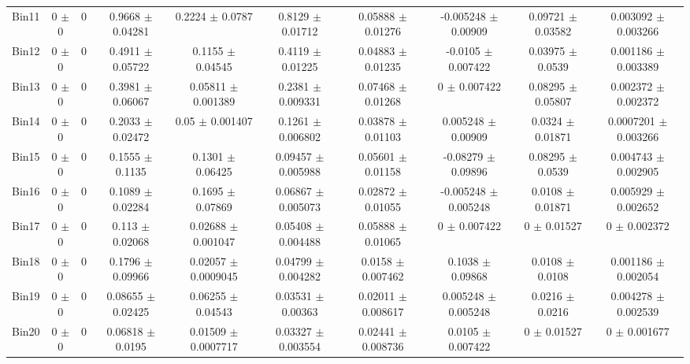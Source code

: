 \begin{tabular}{@{\extracolsep{4pt}}lccccccccc@{}}
     Bin11 & 0 $\pm$ 0 & 0 & 0.9668 $\pm$ 0.04281 & 0.2224 $\pm$ 0.0787 & 0.8129 $\pm$ 0.01712 & 0.05888 $\pm$ 0.01276 & -0.005248 $\pm$ 0.00909 & 0.09721 $\pm$ 0.03582 & 0.003092 $\pm$ 0.003266 \\ 
     Bin12 & 0 $\pm$ 0 & 0 & 0.4911 $\pm$ 0.05722 & 0.1155 $\pm$ 0.04545 & 0.4119 $\pm$ 0.01225 & 0.04883 $\pm$ 0.01235 & -0.0105 $\pm$ 0.007422 & 0.03975 $\pm$ 0.0539 & 0.001186 $\pm$ 0.003389 \\ 
     Bin13 & 0 $\pm$ 0 & 0 & 0.3981 $\pm$ 0.06067 & 0.05811 $\pm$ 0.001389 & 0.2381 $\pm$ 0.009331 & 0.07468 $\pm$ 0.01268 & 0 $\pm$ 0.007422 & 0.08295 $\pm$ 0.05807 & 0.002372 $\pm$ 0.002372 \\ 
     Bin14 & 0 $\pm$ 0 & 0 & 0.2033 $\pm$ 0.02472 & 0.05 $\pm$ 0.001407 & 0.1261 $\pm$ 0.006802 & 0.03878 $\pm$ 0.01103 & 0.005248 $\pm$ 0.00909 & 0.0324 $\pm$ 0.01871 & 0.0007201 $\pm$ 0.003266 \\ 
     Bin15 & 0 $\pm$ 0 & 0 & 0.1555 $\pm$ 0.1135 & 0.1301 $\pm$ 0.06425 & 0.09457 $\pm$ 0.005988 & 0.05601 $\pm$ 0.01158 & -0.08279 $\pm$ 0.09896 & 0.08295 $\pm$ 0.0539 & 0.004743 $\pm$ 0.002905 \\ 
     Bin16 & 0 $\pm$ 0 & 0 & 0.1089 $\pm$ 0.02284 & 0.1695 $\pm$ 0.07869 & 0.06867 $\pm$ 0.005073 & 0.02872 $\pm$ 0.01055 & -0.005248 $\pm$ 0.005248 & 0.0108 $\pm$ 0.01871 & 0.005929 $\pm$ 0.002652 \\ 
     Bin17 & 0 $\pm$ 0 & 0 & 0.113 $\pm$ 0.02068 & 0.02688 $\pm$ 0.001047 & 0.05408 $\pm$ 0.004488 & 0.05888 $\pm$ 0.01065 & 0 $\pm$ 0.007422 & 0 $\pm$ 0.01527 & 0 $\pm$ 0.002372 \\ 
     Bin18 & 0 $\pm$ 0 & 0 & 0.1796 $\pm$ 0.09966 & 0.02057 $\pm$ 0.0009045 & 0.04799 $\pm$ 0.004282 & 0.0158 $\pm$ 0.007462 & 0.1038 $\pm$ 0.09868 & 0.0108 $\pm$ 0.0108 & 0.001186 $\pm$ 0.002054 \\ 
     Bin19 & 0 $\pm$ 0 & 0 & 0.08655 $\pm$ 0.02425 & 0.06255 $\pm$ 0.04543 & 0.03531 $\pm$ 0.00363 & 0.02011 $\pm$ 0.008617 & 0.005248 $\pm$ 0.005248 & 0.0216 $\pm$ 0.0216 & 0.004278 $\pm$ 0.002539 \\ 
     Bin20 & 0 $\pm$ 0 & 0 & 0.06818 $\pm$ 0.0195 & 0.01509 $\pm$ 0.0007717 & 0.03327 $\pm$ 0.003554 & 0.02441 $\pm$ 0.008736 & 0.0105 $\pm$ 0.007422 & 0 $\pm$ 0.01527 & 0 $\pm$ 0.001677 \\ 
\hline\hline
  \end{tabular}
